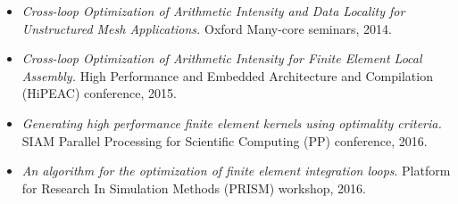 \begin{description}
\begin{itemize}
\item {\em Cross-loop Optimization of Arithmetic Intensity and Data Locality for Unstructured Mesh Applications.} Oxford Many-core seminars, 2014.
\item {\em Cross-loop Optimization of Arithmetic Intensity for Finite Element Local Assembly.} High Performance and Embedded Architecture and Compilation (HiPEAC) conference, 2015.
\item {\em Generating high performance finite element kernels using optimality criteria.} SIAM Parallel Processing for Scientific Computing (PP) conference, 2016.
\item {\em An algorithm for the optimization of finite element integration loops}. Platform for Research In Simulation Methods (PRISM) workshop, 2016.
\end{itemize}
\end{description}


